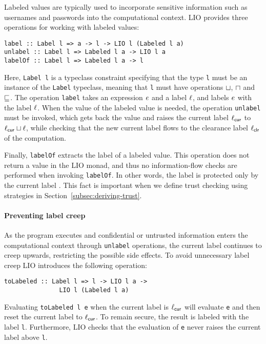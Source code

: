 Labeled values are typically used to incorporate sensitive information such as usernames and passwords into the computational context. LIO provides three operations for working with labeled values:
\begin{verbatim}
label :: Label l => a -> l -> LIO l (Labeled l a)
unlabel :: Label l => Labeled l a -> LIO l a
labelOf :: Label l => Labeled l a -> l
\end{verbatim}
Here, \texttt{Label l} is a typeclass constraint specifying that the type \texttt{l} must be an instance of the \texttt{Label} typeclass, meaning that \texttt{l} must have operations $\sqcup$, $\sqcap$ and $\sqsubseteq$. The operation \texttt{label} takes an expression $e$ and a label $\ell$, and labels $e$ with the label $\ell$. When the value of the labeled value is needed, the operation \texttt{unlabel} must be invoked, which gets back the value and raises the current label $\ell_{\mathsf{cur}}$ to $\ell_{\mathsf{cur}} \sqcup \ell$, while checking that the new current label flows to the clearance label $\ell_{\mathsf{clr}}$ of the computation.

Finally, \texttt{labelOf} extracts the label of a labeled value. This operation does not return a value in the LIO monad, and thus no information-flow checks are performed when invoking \texttt{labelOf}. In other words, the label is protected only by the current label \cite{SRMMlio}. This fact is important when we define trust checking using strategies in Section~\ref{subsec:deriving-trust}.

\paragraph{Preventing label creep}
As the program executes and confidential or untrusted information enters the computational context through \texttt{unlabel} operations, the current label continues to creep upwards, restricting the possible side effects. To avoid unnecessary label creep LIO introduces the following operation:
\begin{verbatim}
toLabeled :: Label l => l -> LIO l a ->
               LIO l (Labeled l a)
\end{verbatim}
Evaluating \texttt{toLabeled l e} when the current label is $\ell_{\mathsf{cur}}$ will evaluate \texttt{e} and then reset the current label to $\ell_{\mathsf{cur}}$. To remain secure, the result is labeled with the label \texttt{l}. Furthermore, LIO checks that the evaluation of \texttt{e} never raises the current label above \texttt{l}.